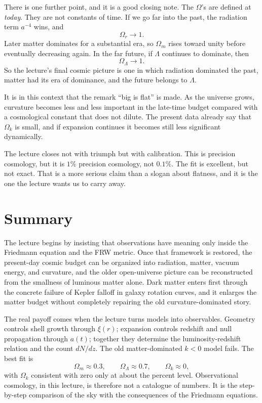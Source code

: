 There is one further point, and it is a good closing note. The \(\Omega\)'s are defined at \emph{today}. They are not constants of time. If we go far into the past, the radiation term \(a^{-4}\) wins, and
\begin{equation}
\Omega_r\to 1.
\end{equation}
Later matter dominates for a substantial era, so \(\Omega_m\) rises toward unity before eventually decreasing again. In the far future, if \(\Lambda\) continues to dominate, then
\begin{equation}
\Omega_\Lambda\to 1.
\end{equation}
So the lecture's final cosmic picture is one in which radiation dominated the past, matter had its era of dominance, and the future belongs to \(\Lambda\).

It is in this context that the remark ``big is flat'' is made. As the universe grows, curvature becomes less and less important in the late-time budget compared with a cosmological constant that does not dilute. The present data already say that \(\Omega_k\) is small, and if expansion continues it becomes still less significant dynamically.

The lecture closes not with triumph but with calibration. This is precision cosmology, but it is \(1\%\) precision cosmology, not \(0.1\%\). The fit is excellent, but not exact. That is a more serious claim than a slogan about flatness, and it is the one the lecture wants us to carry away.

\section{Summary}

The lecture begins by insisting that observations have meaning only inside the Friedmann equation and the FRW metric. Once that framework is restored, the present-day cosmic budget can be organized into radiation, matter, vacuum energy, and curvature, and the older open-universe picture can be reconstructed from the smallness of luminous matter alone. Dark matter enters first through the concrete failure of Kepler falloff in galaxy rotation curves, and it enlarges the matter budget without completely repairing the old curvature-dominated story.

The real payoff comes when the lecture turns models into observables. Geometry controls shell growth through \(\xi(r)\); expansion controls redshift and null propagation through \(a(t)\); together they determine the luminosity-redshift relation and the count \(dN/dz\). The old matter-dominated \(k<0\) model fails. The best fit is
\[
\Omega_m\approx 0.3,\qquad
\Omega_\Lambda\approx 0.7,\qquad
\Omega_k\approx 0,
\]
with \(\Omega_k\) consistent with zero only at about the percent level. Observational cosmology, in this lecture, is therefore not a catalogue of numbers. It is the step-by-step comparison of the sky with the consequences of the Friedmann equations.
